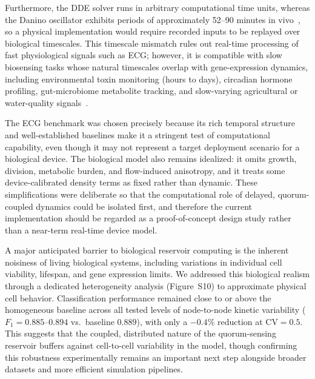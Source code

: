 \documentclass[journal=asbcd6,manuscript=article,keywords]{achemso}
\begin{document}
Furthermore, the DDE solver runs in arbitrary computational time units, whereas the Danino oscillator exhibits periods of approximately 52--90 minutes in vivo~\cite{Danino2010}, so a physical implementation would require recorded inputs to be replayed over biological timescales. 
This timescale mismatch rules out real-time processing of fast physiological signals such as ECG; however, it is compatible with slow biosensing tasks whose natural timescales overlap with gene-expression dynamics, including environmental toxin monitoring (hours to days), circadian hormone profiling, gut-microbiome metabolite tracking, and slow-varying agricultural or water-quality signals~\cite{Chancharoenthana2023,Guerra2023,Wang2022,Negahdary2023}. 

The ECG benchmark was chosen precisely because its rich temporal structure and well-established baselines make it a stringent test of computational capability, even though it may not represent a target deployment scenario for a biological device.
The biological model also remains idealized: it omits growth, division, metabolic burden, and flow-induced anisotropy, and it treats some device-calibrated density terms as fixed rather than dynamic. 
These simplifications were deliberate so that the computational role of delayed, quorum-coupled dynamics could be isolated first, and therefore the current implementation should be regarded as a proof-of-concept design study rather than a near-term real-time device model.

A major anticipated barrier to biological reservoir computing is the inherent noisiness of living biological systems, including variations in individual cell viability, lifespan, and gene expression limits.
We addressed this biological realism through a dedicated heterogeneity analysis (Figure~S10) to approximate physical cell behavior.
Classification performance remained close to or above the homogeneous baseline across all tested levels of node-to-node kinetic variability ($F_1 = 0.885$--$0.894$ vs.\ baseline $0.889$), with only a $-0.4\%$ reduction at $\mathrm{CV} = 0.5$. 
This suggests that the coupled, distributed nature of the quorum-sensing reservoir buffers against cell-to-cell variability in the model, though confirming this robustness experimentally remains an important next step alongside broader datasets and more efficient simulation pipelines.
\end{document}
